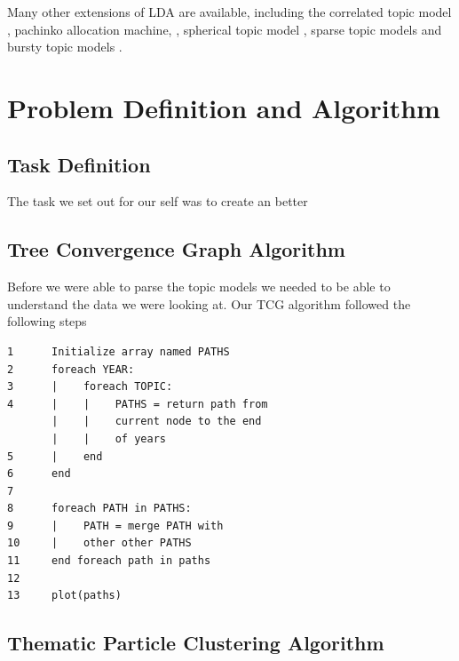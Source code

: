 \documentclass[conference]{IEEEtran}
\begin{document}
Many other extensions of LDA are available, including the correlated topic model \cite{blei2007a}, pachinko allocation machine,  \cite{li2006}, spherical topic model \cite{reisinger2010}, sparse topic models \cite{wang2009} and bursty topic models \cite{doyle2009}.



\section{Problem Definition and Algorithm}


\subsection{Task Definition}
The task we set out for our self was to create an better 




\subsection{Tree Convergence Graph Algorithm}
Before we were able to parse the topic models we needed to be able to understand the data we were looking at. Our TCG algorithm followed the following steps 


\begin{verbatim}
1      Initialize array named PATHS
2      foreach YEAR:
3      |    foreach TOPIC:
4      |    |    PATHS = return path from  
       |    |    current node to the end 
       |    |    of years
5      |    end 
6      end 
7     
8      foreach PATH in PATHS:  
9      |    PATH = merge PATH with
10     |    other other PATHS 
11     end foreach path in paths
12    
13     plot(paths)
\end{verbatim}   

\subsection{Thematic Particle Clustering Algorithm}
\end{document}
